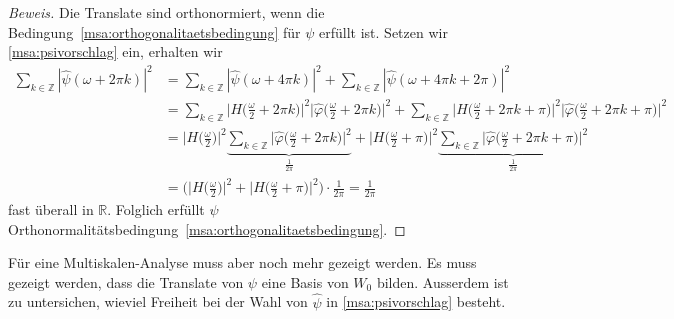 \begin{proof}[Beweis]
Die Translate sind orthonormiert, wenn die
Bedingung~\eqref{msa:orthogonalitaetsbedingung}
für $\psi$ erfüllt ist.
Setzen wir \eqref{msa:psivorschlag} ein, erhalten wir
\begin{align*}
\sum_{k\in\mathbb Z} |\hat{\psi}(\omega+2\pi k)|^2
&=
\sum_{k\in\mathbb Z} |\hat{\psi}(\omega + 4\pi k)|^2
+
\sum_{k\in\mathbb Z} |\hat{\psi}(\omega + 4\pi k + 2\pi)|^2
\\
&=
\sum_{k\in\mathbb Z}
\biggl| H\biggl(\frac{\omega}2+2\pi k\biggr)\biggr|^2
\biggl| \hat{\varphi}\biggl(\frac{\omega}2 + 2\pi k\biggr) \biggr|^2
+
\sum_{k\in\mathbb Z}
\biggl|H\biggl(\frac{\omega}2+2\pi k+ \pi\biggr) \biggr|^2
\biggl|\hat{\varphi}\biggl(\frac{\omega}2 + 2\pi k + \pi\biggr) \biggr|^2
\\
&=
\biggl|H\biggl(\frac{\omega}2\biggr) \biggr|^2
\underbrace{
\sum_{k\in\mathbb Z}
\biggl|\hat{\varphi}\biggl(\frac{\omega}2 + 2\pi k\biggr)  \biggr|^2
}_{\displaystyle\frac{1}{2\pi}}
+
\biggl|H\biggl(\frac{\omega}2+\pi\biggr) \biggr|^2
\underbrace{
\sum_{k\in\mathbb Z}
\biggl|\hat{\varphi}\biggl(\frac{\omega}2 + 2\pi k + \pi\biggr) \biggr|^2
}_{\displaystyle\frac{1}{2\pi}}
\\
&=
\biggl(
\biggl|H\biggl(\frac{\omega}2\biggr) \biggr|^2
+
\biggl|H\biggl(\frac{\omega}2+\pi\biggr) \biggr|^2
\biggr)
\cdot
\frac{1}{2\pi}
=
\frac{1}{2\pi}
\end{align*}
fast überall in $\mathbb R$.
Folglich erfüllt $\psi$
Orthonormalitätsbedingung~\eqref{msa:orthogonalitaetsbedingung}.
\end{proof}

Für eine Multiskalen-Analyse muss aber noch mehr gezeigt werden.
Es muss gezeigt werden, dass die Translate von $\psi$ eine
Basis von $W_0$ bilden.
Ausserdem ist zu untersichen, wieviel Freiheit bei der Wahl von 
$\hat{\psi}$ in \eqref{msa:psivorschlag} besteht.

